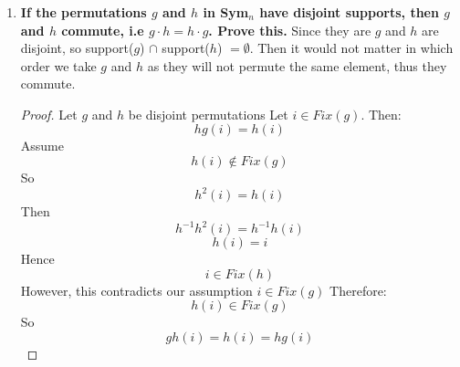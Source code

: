 \subsubsection{}
\begin{enumerate}[label=(\alph*)]
    \item \textbf{If the permutations $g$ and $h$ in Sym${}_n$ have disjoint supports, then $g$ and $h$ commute, i.e $g \cdot h = h \cdot g$. Prove this.} \newline
    Since they are $g$ and $h$ are disjoint, so support($g$) $\cap$ support($h$) $= \emptyset$. Then it would not matter in which order
    we take $g$ and $h$ as they will not permute the same element, thus they commute.

    \begin{proof}[Proof]
        Let $g$ and $h$ be disjoint permutations \newline
        Let $i \in Fix(g)$. Then:
        $$ hg(i) = h(i) $$
        Assume $$ h(i) \notin Fix(g) $$
        So $$ h^2(i) = h(i) $$
        Then
        $$ h^{-1}h^2(i) = h^{-1}h(i) $$
        $$ h(i) = i $$
        Hence $$ i \in Fix(h) $$
        However, this contradicts our assumption $ i \in Fix(g) $ \newline
        Therefore:
        $$ h(i) \in Fix(g) $$
        So
        $$ gh(i) = h(i) = hg(i) $$
    \end{proof}
\end{enumerate}


